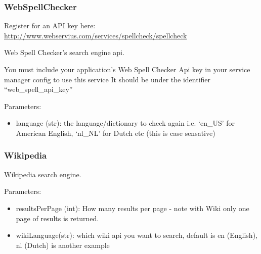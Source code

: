 \documentclass[letterpaper,10pt,english]{sphinxmanual}
\begin{document}
\subsubsection{WebSpellChecker}
\label{api2.0:webspellchecker}
Register for an API key here: \href{http://www.webservius.com/services/spellcheck/spellcheck}{http://www.webservius.com/services/spellcheck/spellcheck}

\begin{fulllineitems}
\label{api2.0:puppy.search.engine.WebSpellChecker}
Web Spell Checker's search engine api.

You must include your application's Web Spell Checker Api key in your service manager config to use this service
It should be under the identifier ``web\_spell\_api\_key''

Parameters:
\begin{itemize}
\item {} 
language (str): the language/dictionary to check again i.e. `en\_US' for American English, `nl\_NL' for Dutch etc (this is case sensative)

\end{itemize}

\end{fulllineitems}



\subsubsection{Wikipedia}
\label{api2.0:wikipedia}

\begin{fulllineitems}
\label{api2.0:puppy.search.engine.Wikipedia}
Wikipedia search engine.

Parameters:
\begin{itemize}
\item {} 
resultsPerPage (int): How many results per page - note with Wiki only one page of results is returned.

\item {} 
wikiLanguage(str): which wiki api you want to search, default is en (English), nl (Dutch) is another example

\end{itemize}

\end{fulllineitems}
\end{document}
